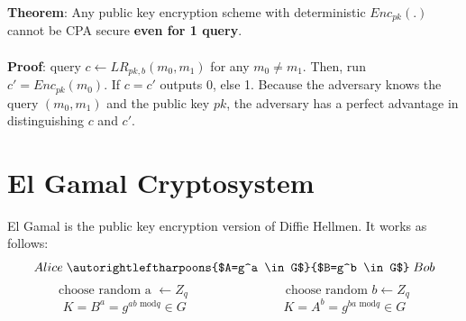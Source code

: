 \documentclass{scribe}
\begin{document}
\vspace{5mm}

\noindent \textbf{Theorem}: Any public key encryption scheme with deterministic $Enc_{pk}(.)$ cannot be CPA secure \textbf{even for 1 query}.
\\\\
\textbf{Proof}: query $c \leftarrow LR_{pk,b}(m_0,m_1)$ for any $m_0 \neq m_1$. Then, run $c' = Enc_{pk}(m_0)$. If $c=c'$ outputs 0, else 1. Because the adversary knows the query $(m_0,m_1)$ and the public key $pk$, the adversary has a perfect advantage in distinguishing $c$ and $c'$.

\vspace{10mm}


\section{El Gamal Cryptosystem}
El Gamal is the public key encryption version of Diffie Hellmen. It works as follows:
$$ Alice \;\autorightleftharpoons{$A=g^a \in G$}{$B=g^b \in G$}\; Bob $$
$$ \text{choose random a }\leftarrow Z_q \;\hspace{3cm}\; \text{choose random }b \leftarrow Z_q $$
$$ K = B^a = g^{ab\text{ mod}q} \in G \;\hspace{3cm}\; K = A^b = g^{ba\text{ mod}q} \in G $$
\end{document}
